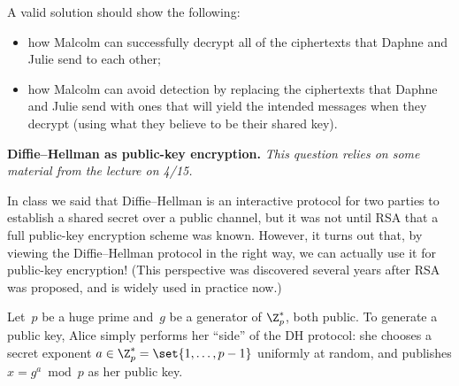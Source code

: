 \documentclass[11pt,addpoints]{exam}
\begin{document}
\begin{questions}
\begin{parts}
\begin{enumerate}
      A valid solution should show the following:
      \begin{itemize}
      \item how Malcolm can successfully decrypt all of the ciphertexts that Daphne and Julie send to each other;
      \item how Malcolm can avoid detection by replacing the ciphertexts that Daphne and Julie send with ones that will yield the intended messages when they decrypt (using what they believe to be their shared key).
      \end{itemize}

      \begin{solution}

      \end{solution}
    \end{enumerate}
  \end{parts}

  \question \textbf{Diffie--Hellman as public-key encryption.} \emph{This question relies on some material from the lecture on 4/15.}

  In class we said that Diffie--Hellman is an interactive protocol for two parties to establish a shared secret over a public channel, but it was not until RSA that a full public-key encryption scheme was known.
  However, it turns out that, by viewing the Diffie--Hellman protocol in the right way, we can actually use it for public-key encryption!
  (This perspective was discovered several years after RSA was proposed, and is widely used in practice now.)

  Let~$p$ be a huge prime and~$g$ be a generator of $\Z_p^*$, both public.
  To generate a public key, Alice simply performs her ``side'' of the DH protocol: she chooses a secret exponent $a \in \Z_p^* = \set{1, \ldots, p-1}$ uniformly at random, and publishes $x = g^a \bmod p$ as her public key.

\end{questions}
\end{document}
